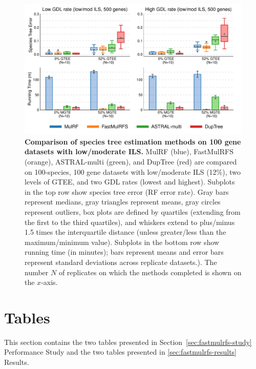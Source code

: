 \begin{figure}[!h]
	\centering
	\includegraphics[width=\textwidth]{figures/fastmulrfs-fig5.pdf}
	\caption{{\bf Comparison of species tree estimation methods on 100 gene datasets with low/moderate ILS.} 
	MulRF (blue), FastMulRFS (orange), ASTRAL-multi (green), and DupTree (red) are compared on 100-species, 100 gene datasets with low/moderate ILS (12\%), two levels of GTEE, and two GDL rates (lowest and highest).
	Subplots in the top row show species tree error (RF error rate).
Gray bars represent medians, gray triangles represent means, gray circles represent outliers, box plots are defined by quartiles (extending from the first to the third quartiles), and whiskers extend to plus/minus 1.5 times the interquartile distance (unless greater/less than the maximum/minimum value).
Subplots in the bottom row show running time (in minutes); bars represent means and error bars represent standard deviations across replicate datasets.).
The number $N$ of replicates on which the methods completed is shown on the $x$-axis.}
\label{fig:fastmulrfs-100gen}	
\end{figure}

\clearpage

\section{Tables}
\label{sec:fastmulrfs-tables}
This section contains the two tables presented in Section~\ref{sec:fastmulrfs-study} Performance Study and the two tables presented in \ref{sec:fastmulrfs-results} Results. 

\vspace{12pt}

